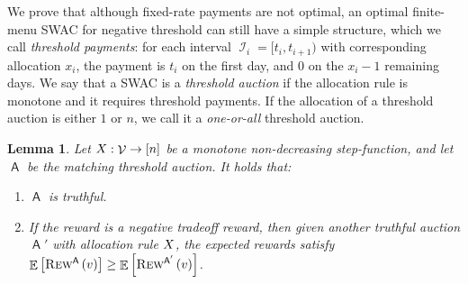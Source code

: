 \documentclass[11pt,letterpaper]{article}
\newcommand{\sqbr}[1]{\left[ #1 \right]}
\newcommand{\fr}{fixed-rate\xspace}
\newcommand{\swac}{SWAC\xspace}
\newcommand{\finauc}{finite-menu \swac}
\DeclareMathOperator*{\E}{\bb{E}}
\newcommand{\sqrrange}[1]{[#1]}
\newcommand{\bb}[1]{\mathbb{#1}}
\DeclareMathOperator{\A}{\auc{A}}
\DeclareMathOperator{\I}{\mathcal{I}}
\DeclareMathOperator{\V}{\mathcal{V}}
\theoremstyle{plain}
\newtheorem{lemma}[theorem]{Lemma}
\newcommand{\auc}[1]{\mathsf{#1}}
\begin{document}
We prove that although \fr payments are not optimal, an optimal \finauc for negative threshold can still have a simple structure, which we call \emph{threshold payments}:
for each interval $\I_i = [t_i, t_{i+1})$
with corresponding allocation $x_i$,
the payment is $t_i$ on the first day, and $0$ on the $x_i - 1$ remaining days. We say that a \swac is a \emph{threshold auction} if the allocation rule is monotone and it requires threshold payments. If the allocation of a threshold auction is either $1$ or $n$, we call it a \emph{one-or-all} threshold auction.

\begin{lemma}\label{lemma:neg-tradeoff-threshold-auction-truthful-and-optimal}
    Let $\alloc:\V\rightarrow\sqrrange{n}$ be a monotone non-decreasing step-function, and let $\A$ be the matching threshold auction. It holds that:
    \begin{enumerate}
        \item $\A$ is truthful.
        \item If the reward is a negative tradeoff reward, then 
        given another truthful auction $\A'$ with allocation rule $\alloc$, the expected rewards satisfy $\E\sqbr{\trew[\A]{v}}\geq\E\sqbr{\trew[\A']{v}}$.
    \end{enumerate}
\end{lemma}
\end{document}
